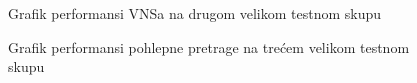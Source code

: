 \documentclass[12pt,oneside]{memoir}
\begin{document}
\vspace{2cm}

\begin{figure}[H]
    \centering
    \hfill
    \caption{Grafik performansi VNSa na drugom velikom testnom skupu}
    \label{fig:test2_vns_performance}
\end{figure}

\vspace{2cm}

\begin{figure}[H]
    \centering
    \hfill
    \caption{Grafik performansi pohlepne pretrage na trećem velikom testnom skupu}
    \label{fig:test3_greedy_performance}
\end{figure}
\end{document}
